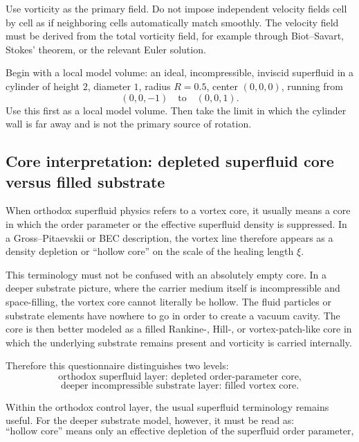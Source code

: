 \documentclass[11pt]{article}
\begin{document}
            Use vorticity as the primary field. Do not impose independent velocity fields cell by cell as if neighboring cells automatically match smoothly. The velocity field must be derived from the total vorticity field, for example through Biot--Savart, Stokes' theorem, or the relevant Euler solution.
            
            Begin with a local model volume: an ideal, incompressible, inviscid superfluid in a cylinder of height \(2\), diameter \(1\), radius \(R=0.5\), center \((0,0,0)\), running from
            \[
                (0,0,-1)
                \quad\text{to}\quad
                (0,0,1).
            \]
            Use this first as a local model volume. Then take the limit in which the cylinder wall is far away and is not the primary source of rotation.
        
            
        \subsection*{Core interpretation: depleted superfluid core versus filled substrate}
        
        When orthodox superfluid physics refers to a vortex core, it usually means a core in which the order parameter or the effective superfluid density is suppressed. In a Gross--Pitaevskii or BEC description, the vortex line therefore appears as a density depletion or ``hollow core'' on the scale of the healing length \(\xi\).
        
        This terminology must not be confused with an absolutely empty core. In a deeper substrate picture, where the carrier medium itself is incompressible and space-filling, the vortex core cannot literally be hollow. The fluid particles or substrate elements have nowhere to go in order to create a vacuum cavity. The core is then better modeled as a filled Rankine-, Hill-, or vortex-patch-like core in which the underlying substrate remains present and vorticity is carried internally.
        
        Therefore this questionnaire distinguishes two levels:
        \[
        \text{orthodox superfluid layer: depleted order-parameter core,}
        \]
        \[
        \text{deeper incompressible substrate layer: filled vortex core.}
        \]
        
        Within the orthodox control layer, the usual superfluid terminology remains useful. For the deeper substrate model, however, it must be read as:
        \[
        \boxed{
        \text{``hollow core'' means only an effective depletion of the superfluid order parameter, not an empty core of the underlying medium.}
        }
        \]
        
\end{document}
